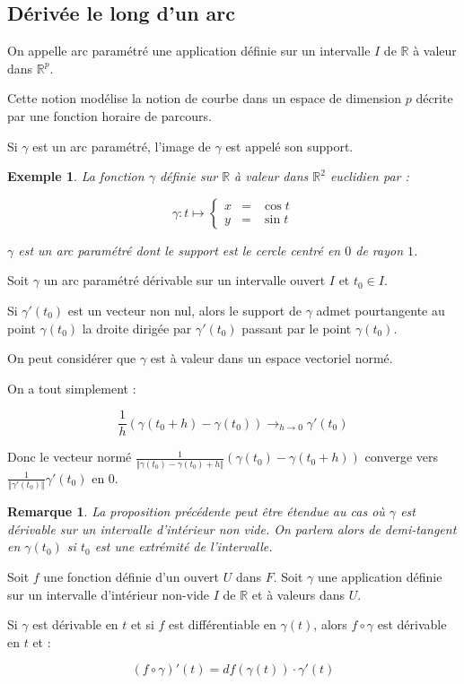 \documentclass[a4paper,12pt]{book}
\newcommand{\Def}[2]{\begin{tcolorbox}[sharp corners, colback=white,colframe=blue!90!black!75, title=Définition : #1]#2\end{tcolorbox}}
\newcommand{\Prop}[2]{\begin{tcolorbox}[sharp corners, colback=white,colframe=red!90!black!75, title=Proposition : #1]#2\end{tcolorbox}}
\newcommand{\Pre}[1]{\begin{tcolorbox}[sharp corners, colback=white,colframe=green!60!green!30!black!75, title=Preuve]#1\end{tcolorbox}}
\newtheorem{Exe}{Exemple}[section]
\newtheorem{Rem}{Remarque}[section]
\def\R{\mathbb{R}}
\begin{document}
\subsection{Dérivée le long d'un arc}
\Def{}{On appelle arc paramétré une application définie sur un intervalle $I$ de $\R$ à valeur dans $\R^p$.
\par Cette notion modélise la notion de courbe dans un espace de dimension $p$ décrite par une fonction horaire de parcours.
\par Si $\gamma$ est un arc paramétré, l'image de $\gamma$ est appelé son support.}
\begin{Exe}
La fonction $\gamma$ définie sur $\R$ à valeur dans $\R^2$ euclidien par :
\par $$\gamma:t\mapsto\left\{\begin{array}{rcl} x & = & \cos t\\ y & = & \sin t\end{array}\right.$$
\par $\gamma$ est un arc paramétré dont le support est le cercle centré en $0$ de rayon $1$.
\end{Exe}
\Prop{}{Soit $\gamma$ un arc paramétré dérivable sur un intervalle ouvert $I$ et $t_0\in I$.
\par Si $\gamma'(t_0)$ est un vecteur non nul, alors le support de $\gamma$ admet pourtangente au point $\gamma(t_0)$ la droite dirigée par $\gamma'(t_0)$ passant par le point $\gamma(t_0)$.}
\Pre{On peut considérer que $\gamma$ est à valeur dans un espace vectoriel normé.
\par On a tout simplement :
\par $$\frac{1}{h}(\gamma(t_0+h)-\gamma(t_0))\to_{h\to 0}\gamma'(t_0)$$
\par Donc le vecteur normé $\frac{1}{\Vert \gamma(t_0)-\gamma(t_0)+h\Vert}(\gamma(t_0)-\gamma(t_0+h))$ converge vers $\frac{1}{\Vert\gamma'(t_0)\Vert}\gamma'(t_0)$ en 0.}
\begin{Rem}
La proposition précédente peut être étendue au cas où $\gamma$ est dérivable sur un intervalle d'intérieur non vide. On parlera alors de demi-tangent en $\gamma(t_0)$ si $t_0$ est une extrémité de l'intervalle.
\end{Rem}
\Prop{Dérivée le long d'un arc}{Soit $f$ une fonction définie d'un ouvert $U$ dans $F$. Soit $\gamma$ une application définie sur un intervalle d'intérieur non-vide $I$ de $\R$ et à valeurs dans $U$.
\par Si $\gamma$ est dérivable en $t$ et si $f$ est différentiable en $\gamma(t)$, alors $f\circ\gamma$ est dérivable en $t$ et :
\par $$(f\circ\gamma)'(t) = df(\gamma(t))\cdot\gamma'(t)$$}
\end{document}

